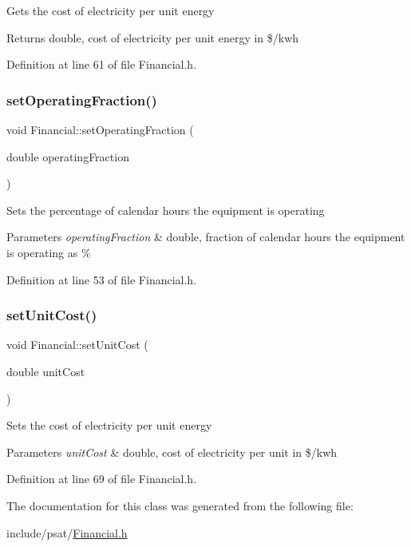 Gets the cost of electricity per unit energy \begin{DoxyReturn}{Returns}
double, cost of electricity per unit energy in \$/kwh 
\end{DoxyReturn}


Definition at line 61 of file Financial.\+h.

\mbox{\label{class_financial_a966250111b2f7a00d797a9d153ee8a83}} 
\subsubsection{\texorpdfstring{set\+Operating\+Fraction()}{setOperatingFraction()}}
{\footnotesize\ttfamily void Financial\+::set\+Operating\+Fraction (\begin{DoxyParamCaption}\item[{double}]{operating\+Fraction }\end{DoxyParamCaption})\hspace{0.3cm}{\ttfamily [inline]}}

Sets the percentage of calendar hours the equipment is operating 
\begin{DoxyParams}{Parameters}
{\em operating\+Fraction} & double, fraction of calendar hours the equipment is operating as \% \\
\hline
\end{DoxyParams}


Definition at line 53 of file Financial.\+h.

\mbox{\label{class_financial_a84ead2ef72b2d348e05eb308d01e9265}} 
\subsubsection{\texorpdfstring{set\+Unit\+Cost()}{setUnitCost()}}
{\footnotesize\ttfamily void Financial\+::set\+Unit\+Cost (\begin{DoxyParamCaption}\item[{double}]{unit\+Cost }\end{DoxyParamCaption})\hspace{0.3cm}{\ttfamily [inline]}}

Sets the cost of electricity per unit energy 
\begin{DoxyParams}{Parameters}
{\em unit\+Cost} & double, cost of electricity per unit in \$/kwh \\
\hline
\end{DoxyParams}


Definition at line 69 of file Financial.\+h.



The documentation for this class was generated from the following file\+:\begin{DoxyCompactItemize}
\item 
include/psat/\hyperlink{_financial_8h}{Financial.\+h}\end{DoxyCompactItemize}
